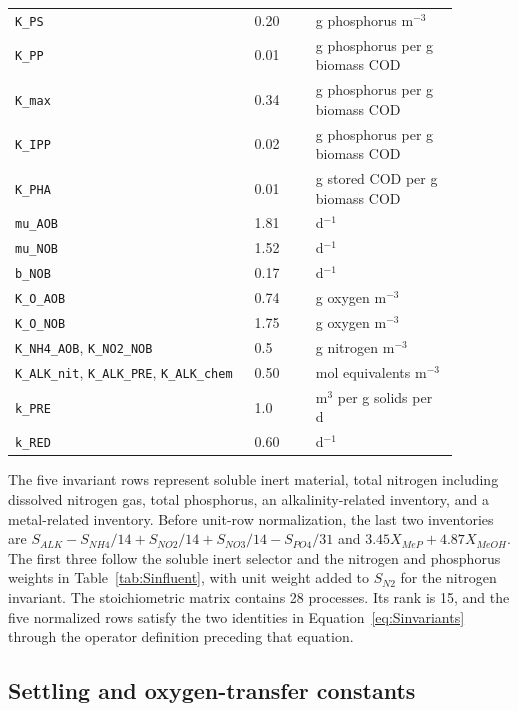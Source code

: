 \documentclass[a4paper,fleqn]{cas-sc}
\begin{document}
\begin{longtable}{p{0.47\linewidth}p{0.12\linewidth}p{0.29\linewidth}}
\texttt{K\_PS} & 0.20 & g phosphorus m$^{-3}$\\
\texttt{K\_PP} & 0.01 & g phosphorus per g biomass COD\\
\texttt{K\_max} & 0.34 & g phosphorus per g biomass COD\\
\texttt{K\_IPP} & 0.02 & g phosphorus per g biomass COD\\
\texttt{K\_PHA} & 0.01 & g stored COD per g biomass COD\\
\texttt{mu\_AOB} & 1.81 & d$^{-1}$\\
\texttt{mu\_NOB} & 1.52 & d$^{-1}$\\
\texttt{b\_NOB} & 0.17 & d$^{-1}$\\
\texttt{K\_O\_AOB} & 0.74 & g oxygen m$^{-3}$\\
\texttt{K\_O\_NOB} & 1.75 & g oxygen m$^{-3}$\\
\texttt{K\_NH4\_AOB}, \texttt{K\_NO2\_NOB} & 0.5 & g nitrogen m$^{-3}$\\
\texttt{K\_ALK\_nit}, \texttt{K\_ALK\_PRE}, \texttt{K\_ALK\_chem} & 0.50 & mol equivalents m$^{-3}$\\
\texttt{k\_PRE} & 1.0 & m$^3$ per g solids per d\\
\texttt{k\_RED} & 0.60 & d$^{-1}$\\
\bottomrule
\end{longtable}

The five invariant rows represent soluble inert material, total nitrogen including dissolved nitrogen gas, total phosphorus, an alkalinity-related inventory, and a metal-related inventory. Before unit-row normalization, the last two inventories are $S_{ALK}-S_{NH4}/14+S_{NO2}/14+S_{NO3}/14-S_{PO4}/31$ and $3.45X_{MeP}+4.87X_{MeOH}$. The first three follow the soluble inert selector and the nitrogen and phosphorus weights in Table~\ref{tab:Sinfluent}, with unit weight added to $S_{N2}$ for the nitrogen invariant. The stoichiometric matrix contains 28 processes. Its rank is 15, and the five normalized rows satisfy the two identities in Equation~\eqref{eq:Sinvariants} through the operator definition preceding that equation.

\subsection{Settling and oxygen-transfer constants}
\label{sec:Ssettling}
\end{document}
